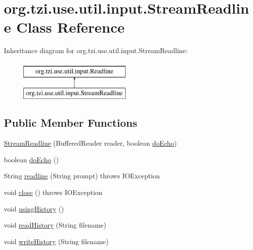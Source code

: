 \hypertarget{classorg_1_1tzi_1_1use_1_1util_1_1input_1_1_stream_readline}{\section{org.\-tzi.\-use.\-util.\-input.\-Stream\-Readline Class Reference}
\label{classorg_1_1tzi_1_1use_1_1util_1_1input_1_1_stream_readline}
}
Inheritance diagram for org.\-tzi.\-use.\-util.\-input.\-Stream\-Readline\-:\begin{figure}[H]
\begin{center}
\leavevmode
\includegraphics[height=2.000000cm]{classorg_1_1tzi_1_1use_1_1util_1_1input_1_1_stream_readline}
\end{center}
\end{figure}
\subsection*{Public Member Functions}
\begin{DoxyCompactItemize}
\item 
\hyperlink{classorg_1_1tzi_1_1use_1_1util_1_1input_1_1_stream_readline_addc00ab6d290dd8ce2a03b319eea423f}{Stream\-Readline} (Buffered\-Reader reader, boolean \hyperlink{classorg_1_1tzi_1_1use_1_1util_1_1input_1_1_stream_readline_aa9340fc5ae8994c18652b1ba20b1dc72}{do\-Echo})
\item 
boolean \hyperlink{classorg_1_1tzi_1_1use_1_1util_1_1input_1_1_stream_readline_aa9340fc5ae8994c18652b1ba20b1dc72}{do\-Echo} ()
\item 
String \hyperlink{classorg_1_1tzi_1_1use_1_1util_1_1input_1_1_stream_readline_ad228cdc9e5f1ba17d4cb698cc9bcbb97}{readline} (String prompt)  throws I\-O\-Exception 
\item 
void \hyperlink{classorg_1_1tzi_1_1use_1_1util_1_1input_1_1_stream_readline_af58e1a82f7067ec6f648bb6d01aacb90}{close} ()  throws I\-O\-Exception 
\item 
void \hyperlink{classorg_1_1tzi_1_1use_1_1util_1_1input_1_1_stream_readline_afa6b1504dd4d7527cd7c19a1b21f4c15}{using\-History} ()
\item 
void \hyperlink{classorg_1_1tzi_1_1use_1_1util_1_1input_1_1_stream_readline_a0e7bbba28a0cec4bafb1aec45e5d1c0d}{read\-History} (String filename)
\item 
void \hyperlink{classorg_1_1tzi_1_1use_1_1util_1_1input_1_1_stream_readline_a7029d42e7b5936a3d272e5c70b079a09}{write\-History} (String filename)
\end{DoxyCompactItemize}


